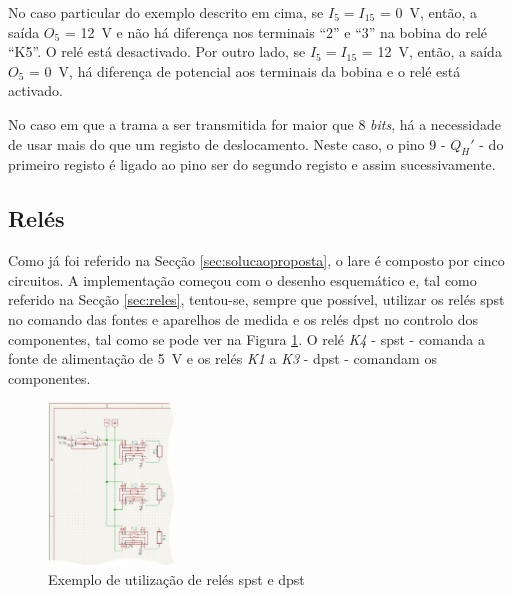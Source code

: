 
No caso particular do exemplo descrito em cima, se $I_{5} = I_{15}$ = \SI{0}{\volt}, então, a saída $O_{5}$ = \SI{12}{\volt} e não há diferença nos terminais ``2'' e ``3'' na bobina do relé  ``K5''. O relé está desactivado. Por outro lado, se $I_{5} = I_{15}$ = \SI{12}{\volt}, então, a saída $O_{5}$ = \SI{0}{\volt}, há diferença de potencial aos terminais da bobina e o relé está activado.

No caso em que a trama a ser transmitida for maior que 8 \textit{bits}, há a necessidade de usar mais do que um registo de deslocamento. Neste caso, o pino 9 - $Q_{H}'$ - do primeiro registo é ligado ao pino \acrshort{ser} do segundo registo e assim sucessivamente.

\subsection{Relés}
\label{sec:hwreles}
Como já foi referido na Secção \ref{sec:solucaoproposta}, o \acrshort{lare} é composto por cinco circuitos. A implementação começou com o desenho esquemático e, tal como referido na Secção \ref{sec:reles}, tentou-se, sempre que possível, utilizar os relés \acrshort{spst} no comando das fontes e aparelhos de medida e os relés \acrshort{dpst} no controlo dos componentes, tal como se pode ver na Figura \ref{fig:relespstdpst}. O relé \textit{K4} - \acrshort{spst} - comanda a fonte de alimentação de \SI{5}{\volt} e os relés \textit{K1} a \textit{K3} - \acrshort{dpst} - comandam os componentes.

\begin{figure}[hbtp]
	\centering
	\includegraphics[width=0.3\textwidth]{figures/exemplo_reles_spst.png}
	\caption{Exemplo de utilização de relés \acrshort{spst} e \acrshort{dpst}}
	\label{fig:relespstdpst}
\end{figure}

